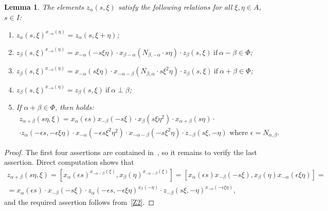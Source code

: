 \documentclass[oneside, 8pt]{amsart}
\newtheorem{lemma}{Lemma}
\theoremstyle{remark}
\theoremstyle{definition}
\numberwithin{equation}{section}
\begin{document}
\begin{lemma}\label{Zrels} The elements $z_\alpha(s, \xi)$ satisfy the following relations for all $\xi, \eta\in A$, $s\in I$:
\begin{enumerate} 
\item\label{Z1} $z_{\alpha}(s, \xi) ^ {x_{-\alpha}(\eta)} = z_{\alpha}(s, \xi + \eta)$;
\item\label{Z2} $z_{\beta}(s, \xi) ^ {x_{-\alpha}(\eta)} = x_{-\alpha} (- s\xi \eta) \cdot x_{\beta-\alpha} (N_{\beta, -\alpha}\cdot s\eta)     \cdot z_{\beta}(s, \xi)\ \text{if}\ \alpha - \beta \in \Phi$;
\item\label{Z3} $z_{\beta}(s, \xi) ^ {x_{-\alpha}(\eta)} = x_{-\alpha} (s\xi \eta) \cdot x_{-\alpha-\beta} (N_{\beta,\alpha}\cdot s\xi^2\eta) \cdot z_{\beta}(s, \xi)\ \text{if}\ \alpha + \beta \in \Phi$;
\item\label{Z4} $z_{\beta}(s, \xi) ^ {x_{-\alpha}(\eta)} = z_{\beta}(s, \xi)\ \text{if}\ \alpha\perp\beta$;
\item\label{Z5} If $\alpha+\beta\in\Phi$, then holds:
\begin{multline} \nonumber z_{\alpha+\beta}(s\eta, \xi) = x_\alpha(\epsilon s) x_{-\beta}(-s\xi) \cdot x_{\beta}(s\xi\eta^2) \cdot x_{\alpha+\beta}(s \eta) \cdot \\ \cdot z_\alpha(-\epsilon s, -\epsilon \xi\eta) \cdot
  x_{-\alpha}(-\epsilon s\xi^2\eta^2) \cdot x_{-\alpha-\beta}(- s \xi^2 \eta) \cdot z_{-\beta}(s\xi, -\eta)\text{ where $\epsilon = N_{\alpha,\beta}$.}\end{multline}
\end{enumerate} \end{lemma}
\begin{proof}
The first four assertions are contained in~\cite[Lemma~9]{S15}, so it remains to verify the last assertion.
Direct computation shows that
\begin{multline} \nonumber
  z_{\alpha+\beta}(s\eta, \xi) = [x_\alpha(\epsilon s)^{x_{-\alpha-\beta}(\xi)}, x_\beta(\eta)^{x_{-\alpha-\beta}(\xi)}] =
  [x_\alpha(\epsilon s) x_{-\beta}(-s\xi), x_{\beta}(\eta) x_{-\alpha}(\epsilon \xi\eta)] = \\ 
  = x_\alpha(\epsilon s) \cdot x_{-\beta}(-s\xi) \cdot z_\alpha(-\epsilon s, -\epsilon \xi\eta)^{x_{\beta}(-\eta)} \cdot z_{-\beta}(s\xi, -\eta)^{x_{-\alpha}(-\epsilon \xi\eta)},
\end{multline} 
and the required assertion follows from~\eqref{Z2}.
\end{proof}
\end{document}
